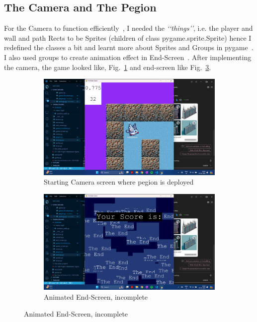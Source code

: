 \documentclass{article}
\begin{document}
\subsection{The Camera and The Pegion}
For the Camera to function efficiently~\cite{camera_tutorial}, I needed the \textit{\lq\lq things\rq\rq}, i.e. the player and wall and path Rects to be Sprites (children of class pygame.sprite.Sprite) hence I redefined the classes a bit and learnt more about Sprites and Groups in pygame~\cite{sprite_reference}. I also used groups to create animation effect in End-Screen~\cite*{end-scren_animation}. After implementing the camera, the game looked like, Fig.~\ref{fig:camera1} and end-screen like Fig.~\ref{fig:camera2}.

\begin{figure}[h]
    \caption[1]{}
    \begin{subfigure}[b]{0.5\textwidth}
        \centering
        \includegraphics[width=\textwidth]{screenshots/Screenshot (174).png}
        \caption[(a)]{Starting Camera screen where pegion is deployed}
        \label{fig:camera1}
    \end{subfigure}
    \begin{subfigure}[b]{0.5\textwidth}
        \centering
        \includegraphics[width=\textwidth]{screenshots/Screenshot (175).png}
        \caption[(a)]{Animated End-Screen, incomplete}
        \label{fig:camera2}
    \end{subfigure}
\end{figure}
\end{document}
